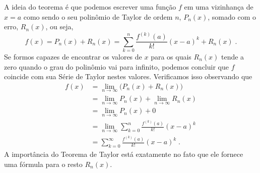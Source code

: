A ideia do teorema é que podemos escrever uma função $f$ em
uma vizinhança de $x=a$ como sendo o seu polinômio de Taylor de
ordem $n$, $P_n(x)$, somado com o erro, $R_n(x)$, ou seja,
\[
  f(x) = P_n(x) + R_n(x)
       = \sum_{k=0}^n \frac{f^{(k)}(a)}{k!}(x-a)^k
       + R_n(x)    \;.
\]
Se formos capazes de encontrar os valores de $x$ para os quais
$R_n(x)$ tende a zero quando o grau do polinômio vai para infinito,
podemos concluir que $f$ coincide com sua Série de Taylor nestes valores.
Verificamos isso observando que
\begin{align*}
	f(x) & = \lim_{n\rightarrow \infty} \big( P_n(x) + R_n(x) \big)                    \\[3mm]
	     & = \lim_{n\rightarrow \infty} P_n(x) + \lim_{n\rightarrow \infty} R_n(x)     \\[3mm]
       & = \lim_{n\rightarrow \infty} P_n(x) + 0                                     \\[3mm]
       & = \lim_{n\rightarrow \infty} \sum_{k=0}^n \frac{f^{(k)}(a)}{k!}(x-a)^k      \\[3mm]
	     & = \sum_{k=0}^\infty \frac{f^{(k)}(a)}{k!}(x-a)^k    \;.
\end{align*}
A importância do Teorema de Taylor está exatamente no fato que ele fornece
uma fórmula para o resto $R_n(x)$.

